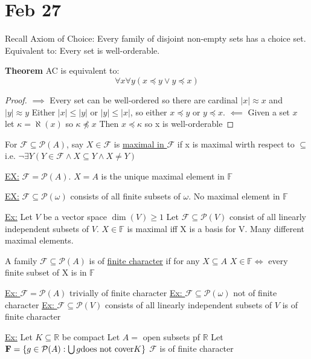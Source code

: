 
\section{Feb 27}

Recall Axiom of Choice: Every family of disjoint non-empty sets has a choice set.
Equivalent to: Every set is well-orderable.

\textbf{Theorem} AC is equivalent to:
\[\forall x \forall y (x \preceq y \vee y \preceq x)\]

\begin{proof}
    $\implies$ Every set can be well-ordered so there are cardinal $|x| \approx x$ and $|y| \approx y$
    Either $|x| \leq |y|$ or $|y| \leq |x|$, so either $x \preceq y$ or $y \preceq x$.
    $\impliedby$ Given a set $x$ let $\kappa = \aleph(x)$ so $\kappa \npreceq x$
    Then $x \preceq \kappa$ so x is well-orderable
\end{proof}

\dfn For $\mathcal{F} \subseteq \mathcal{P}(A)$, say $X \in \mathcal{F}$ is \underline{maximal in $\mathcal{F}$} if x is maximal wirth respect to $\subseteq$
i.e. $\neg \exists Y (Y \in \mathcal{F} \wedge X \subseteq Y \wedge X \neq Y)$

\underline{EX:} $\mathcal{F} = \mathcal{P}(A)$.
$X=A$ is the unique maximal element in $\mathbb{F}$

\underline{EX:} $\mathcal{F} \subseteq \mathcal{P}(\omega)$ consists of all finite subsets of $\omega$.
No maximal element in $\mathbb{F}$

\underline{Ex:} Let $V$ be a vector space $\dim(V) \geq 1$
Let $\mathcal{F} \subseteq \mathcal{P}(V)$ consist of all linearly independent subsets of $V$.
$X \in \mathbb{F}$ is maximal iff X is a basis for V.
Many different maximal elements.

\dfn A family $\mathcal{F} \subseteq \mathcal{P}(A)$ is of \underline{finite character} if for any
$X \subseteq A$ $X \in \mathbb{F} \iff$ every finite subset of X is in $\mathbb{F}$

\underline{Ex: } $\mathcal{F} = \mathcal{P}(A)$ trivially of finite character
\underline{Ex: } $\mathcal{F} \subseteq \mathcal{P}(\omega)$ not of finite character
\underline{Ex: } $\mathcal{F} \subseteq \mathcal{P}(V)$ consists of all linearly independent subsets of $V$ is of finite character


\underline{Ex:} Let $K \subseteq \mathbb{R}$ be compact
Let $A = $ open subsets pf $\mathbb{R}$
Let $\mathbf{F} = \{g \in \mathcal{P}(A) : \bigcup g \text{does not cover} K\}$
$\mathcal{F}$ is of finite character

